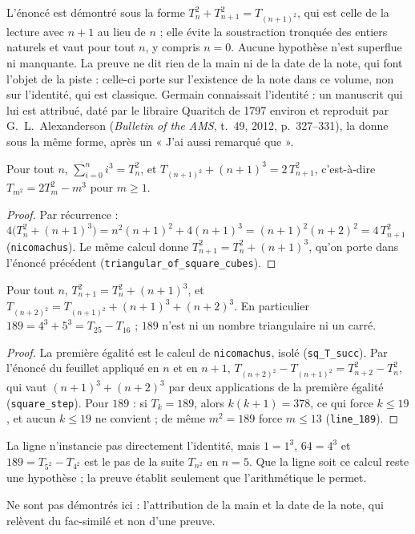 \begin{remarque}
L'énoncé est démontré sous la forme $T_n^2 + T_{n+1}^2 = T_{(n+1)^2}$, qui est celle de la lecture avec $n + 1$ au lieu de $n$ ; elle évite la soustraction tronquée des entiers naturels et vaut pour tout $n$, y compris $n = 0$. Aucune hypothèse n'est superflue ni manquante. La preuve ne dit rien de la main ni de la date de la note, qui font l'objet de la piste : celle-ci porte sur l'existence de la note dans ce volume, non sur l'identité, qui est classique. Germain connaissait l'identité : un manuscrit qui lui est attribué, daté par le libraire Quaritch de 1797 environ et reproduit par G.~L.~Alexanderson (\emph{Bulletin of the AMS}, t.~49, 2012, p.~327--331), la donne sous la même forme, après un « J'ai aussi remarqué que ».
\end{remarque}

\begin{enonce}
Pour tout $n$, $\sum_{i=0}^{n} i^3 = T_n^2$, et $T_{(n+1)^2} + (n+1)^3 = 2\,T_{n+1}^2$, c'est-à-dire $T_{m^2} = 2T_m^2 - m^3$ pour $m \geq 1$.
\end{enonce}

\begin{proof}
Par récurrence : $4\big(T_n^2 + (n+1)^3\big) = n^2(n+1)^2 + 4(n+1)^3 = (n+1)^2(n+2)^2 = 4\,T_{n+1}^2$ (\texttt{nicomachus}). Le même calcul donne $T_{n+1}^2 = T_n^2 + (n+1)^3$, qu'on porte dans l'énoncé précédent (\texttt{triangular\_of\_square\_cubes}).
\end{proof}

\begin{enonce}
Pour tout $n$, $T_{n+1}^2 = T_n^2 + (n+1)^3$, et $T_{(n+2)^2} = T_{(n+1)^2} + (n+1)^3 + (n+2)^3$. En particulier $189 = 4^3 + 5^3 = T_{25} - T_{16}$ ; $189$ n'est ni un nombre triangulaire ni un carré.
\end{enonce}

\begin{proof}
La première égalité est le calcul de \texttt{nicomachus}, isolé (\texttt{sq\_T\_succ}). Par l'énoncé du feuillet appliqué en $n$ et en $n+1$, $T_{(n+2)^2} - T_{(n+1)^2} = T_{n+2}^2 - T_n^2$, qui vaut $(n+1)^3 + (n+2)^3$ par deux applications de la première égalité (\texttt{square\_step}). Pour $189$ : si $T_k = 189$, alors $k(k+1) = 378$, ce qui force $k \leq 19$, et aucun $k \leq 19$ ne convient ; de même $m^2 = 189$ force $m \leq 13$ (\texttt{line\_189}).
\end{proof}

La ligne n'instancie pas directement l'identité, mais $1 = 1^3$, $64 = 4^3$ et $189 = T_{5^2} - T_{4^2}$ est le pas de la suite $T_{n^2}$ en $n = 5$. Que la ligne soit ce calcul reste une hypothèse ; la preuve établit seulement que l'arithmétique le permet.

Ne sont pas démontrés ici : l'attribution de la main et la date de la note, qui relèvent du fac-similé et non d'une preuve.
